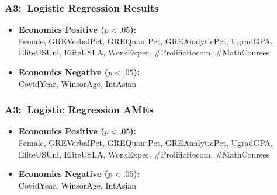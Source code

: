 \documentclass[12pt, aspectratio=169]{beamer}
\begin{document}
\begin{frame}[label=lrr]
\frametitle{A3:\ Logistic Regression Results}
\centering
\renewcommand{\thetable}{\arabic{table}a}
\vspace{-7.5pt}
\begin{minipage}[t]{0.3\textwidth}
\end{minipage}%
\hfill
\begin{minipage}[c][0.8\textheight][c]{0.7\textwidth}
\begin{itemize}
\item \textbf{Economics Positive ($p<.05$):}\ \\ Female, GREVerbalPct, GREQuantPct, GREAnalyticPct, UgradGPA, EliteUSUni, EliteUSLA, WorkExper, \#ProlificRecom, \#MathCourses
\vspace{10pt}
\item \textbf{Economics Negative ($p<.05$):}\ \\ CovidYear, WinsorAge, IntAsian
\end{itemize}
\end{minipage}
\raggedright
\hyperlink{pllra}{}
\end{frame}

\begin{frame}[label=lra]
\frametitle{A3:\ Logistic Regression AMEs}
\addtocounter{framenumber}{-1}
\centering
\addtocounter{table}{-1}
\renewcommand{\thetable}{\arabic{table}b}
\vspace{-7.5pt}
\begin{minipage}[t]{0.3\textwidth}
\end{minipage}%
\hfill
\begin{minipage}[c][0.8\textheight][c]{0.7\textwidth}
\begin{itemize}
\item \textbf{Economics Positive ($p<.05$):}\ \\ Female, GREVerbalPct, GREQuantPct, GREAnalyticPct, UgradGPA, EliteUSUni, EliteUSLA, WorkExper, \#ProlificRecom, \#MathCourses
\vspace{10pt}
\item \textbf{Economics Negative ($p<.05$):}\ \\ CovidYear, WinsorAge, IntAsian
\end{itemize}
\end{minipage}
\raggedright
\hyperlink{pllra}{}
\end{frame}
\end{document}
